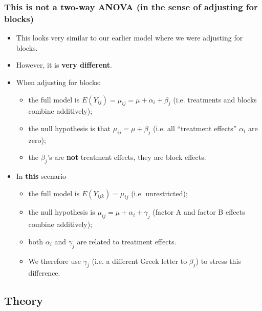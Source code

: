 \documentclass[a4paper]{article}\usepackage[]{graphicx}\usepackage[]{xcolor}
\begin{document}
\subsubsection{This is not a two-way ANOVA (in the sense of adjusting for blocks)}
\begin{itemize}
	\item This looks very similar to our earlier model where we were adjusting for blocks.
	\item However, it is \textbf{very different}.
	\item When adjusting for blocks:
	\begin{itemize}
		\item the full model is \( E(Y_{ij})=\mu_{ij}=\mu+\alpha_i+\beta_j \) (i.e. treatments and blocks combine additively);
		\item the null hypothesis is that \( \mu_{ij} = \mu + \beta_j \) (i.e. all ``treatment effects'' \( \alpha_i \) are zero);
		\item the \( \beta_j \)'s are \textbf{not} treatment effects, they are block effects.
	\end{itemize}
	\item In \textbf{this} scenario
	\begin{itemize}
		\item the full model is \( E(Y_{ijk}) = \mu_{ij} \) (i.e. unrestricted);
		\item the null hypothesis is \( \mu_{ij}=\mu+\alpha_i+\gamma_j \) (factor A and factor B effects combine additively);
		\item both \( \alpha_i \) and \( \gamma_j \) are related to treatment effects.
		\item We therefore use \( \gamma_j \) (i.e. a different Greek letter to \( \beta_j \)) to stress this difference.
	\end{itemize}
\end{itemize}
\subsection{Theory}
\end{document}
